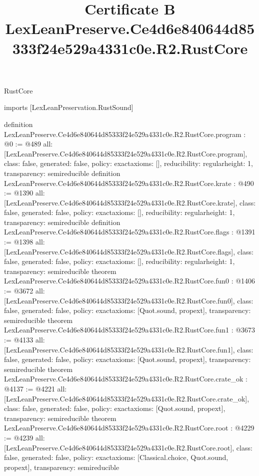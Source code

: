 \begin{lexlean}{RustCore}
\title{Certificate B LexLeanPreserve.Ce4d6e840644d85333f24e529a4331c0e.R2.RustCore}
\begin{coremodule}
imports [LexLeanPreservation.RustSound]

definition LexLeanPreserve.Ce4d6e840644d85333f24e529a4331c0e.R2.RustCore.program : @0 := @489 {
  all: [LexLeanPreserve.Ce4d6e840644d85333f24e529a4331c0e.R2.RustCore.program],
  class: false,
  generated: false,
  policy: exact{axioms: []},
  reducibility: regular{height: 1},
  transparency: semireducible
}
definition LexLeanPreserve.Ce4d6e840644d85333f24e529a4331c0e.R2.RustCore.krate : @490 := @1390 {
  all: [LexLeanPreserve.Ce4d6e840644d85333f24e529a4331c0e.R2.RustCore.krate],
  class: false,
  generated: false,
  policy: exact{axioms: []},
  reducibility: regular{height: 1},
  transparency: semireducible
}
definition LexLeanPreserve.Ce4d6e840644d85333f24e529a4331c0e.R2.RustCore.flags : @1391 := @1398 {
  all: [LexLeanPreserve.Ce4d6e840644d85333f24e529a4331c0e.R2.RustCore.flags],
  class: false,
  generated: false,
  policy: exact{axioms: []},
  reducibility: regular{height: 1},
  transparency: semireducible
}
theorem LexLeanPreserve.Ce4d6e840644d85333f24e529a4331c0e.R2.RustCore.fun0 : @1406 := @3672 {
  all: [LexLeanPreserve.Ce4d6e840644d85333f24e529a4331c0e.R2.RustCore.fun0],
  class: false,
  generated: false,
  policy: exact{axioms: [Quot.sound, propext]},
  transparency: semireducible
}
theorem LexLeanPreserve.Ce4d6e840644d85333f24e529a4331c0e.R2.RustCore.fun1 : @3673 := @4133 {
  all: [LexLeanPreserve.Ce4d6e840644d85333f24e529a4331c0e.R2.RustCore.fun1],
  class: false,
  generated: false,
  policy: exact{axioms: [Quot.sound, propext]},
  transparency: semireducible
}
theorem LexLeanPreserve.Ce4d6e840644d85333f24e529a4331c0e.R2.RustCore.crate_ok : @4137 := @4221 {
  all: [LexLeanPreserve.Ce4d6e840644d85333f24e529a4331c0e.R2.RustCore.crate_ok],
  class: false,
  generated: false,
  policy: exact{axioms: [Quot.sound, propext]},
  transparency: semireducible
}
theorem LexLeanPreserve.Ce4d6e840644d85333f24e529a4331c0e.R2.RustCore.root : @4229 := @4239 {
  all: [LexLeanPreserve.Ce4d6e840644d85333f24e529a4331c0e.R2.RustCore.root],
  class: false,
  generated: false,
  policy: exact{axioms: [Classical.choice, Quot.sound, propext]},
  transparency: semireducible
}


\end{coremodule}
\end{lexlean}
